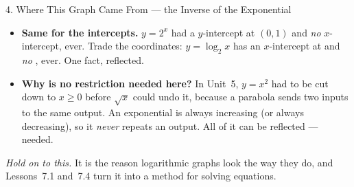 \documentclass[10pt]{article}
\begin{document}
\begin{notesbox}{4. Where This Graph Came From --- the Inverse of the Exponential}
\begin{itemize}[leftmargin=1.5em, itemsep=3pt]
        logarithm's \emph{vertical} asymptote. It is the same boundary, seen sideways.
  \item \textbf{Same for the intercepts.} $y=2^x$ had a $y$-intercept at $(0,1)$ and \emph{no}
        $x$-intercept, ever. Trade the coordinates: $y=\log_2 x$ has an $x$-intercept at
        \blank{1.4cm} and \emph{no} \blank{2.0cm}, ever. One fact, reflected.
  \item \textbf{Why is no restriction needed here?} In Unit~5, $y=x^2$ had to be cut down to $x\ge0$
        before $\sqrt{x}$ could undo it, because a parabola sends two inputs to the same output. An
        exponential is always increasing (or always decreasing), so it \emph{never} repeats an
        output. All of it can be reflected --- \blank{4.4cm} needed.
\end{itemize}
\emph{Hold on to this.} It is the reason logarithmic graphs look the way they do, and Lessons~7.1
and~7.4 turn it into a method for solving equations.
\end{notesbox}
\end{document}
